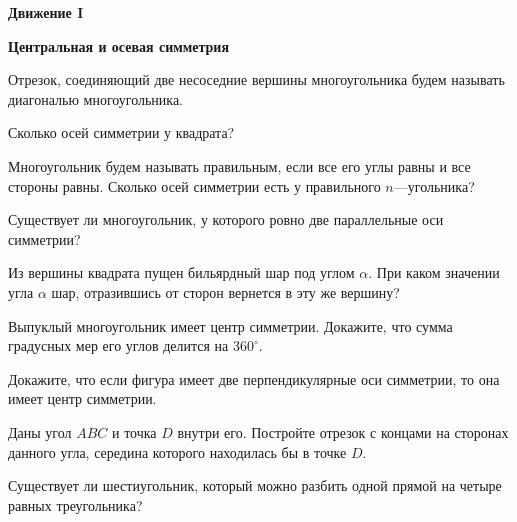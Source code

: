 \centerline{\bf \Huge Движение I}
\centerline{\bf \Huge Центральная и осевая симметрия}

\begin{flushright}
        \scriptsize{}
\end{flushright}

Отрезок, соединяющий две несоседние вершины многоугольника будем называть диагональю многоугольника.

Сколько осей симметрии у квадрата?

Многоугольник будем называть правильным, если все его углы равны и все стороны равны. Сколько осей симметрии есть у правильного $n$---угольника?

Существует ли многоугольник, у которого ровно две параллельные оси симметрии?

Из вершины квадрата пущен бильярдный шар под углом $\alpha$. При каком значении угла $\alpha$ шар, отразившись от сторон вернется в эту же вершину?

Выпуклый многоугольник имеет центр симметрии. Докажите, что сумма градусных мер его углов делится на $360^{\circ}$.

Докажите, что если фигура имеет две перпендикулярные оси симметрии, то она имеет центр симметрии.

Даны угол $ABC$ и точка $D$ внутри его. Постройте отрезок с концами на сторонах данного угла, середина которого находилась бы в точке $D$.

Существует ли шестиугольник, который можно разбить одной прямой на четыре равных треугольника?